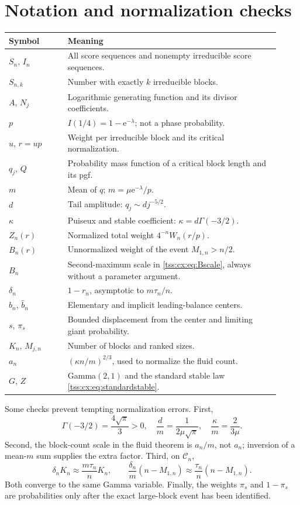 \documentclass[11pt]{article}
\theoremstyle{remark}\newtheorem{remark}[theorem]{Remark}
\theoremstyle{definition}\newtheorem{definition}[theorem]{Definition}
\newcommand{\e}{\mathrm e}
\newcommand{\Cev}{\mathcal C_n}
\begin{document}
\section{Notation and normalization checks}\label{tss:cx:app:notation}
\begin{longtable}{@{}p{0.20\linewidth}p{0.72\linewidth}@{}}
\toprule
Symbol & Meaning\\
\midrule\endhead
$S_n$, $I_n$ & All score sequences and nonempty irreducible score sequences.\\
$S_{n,k}$ & Number with exactly $k$ irreducible blocks.\\
$A$, $N_j$ & Logarithmic generating function and its divisor coefficients.\\
$p$ & $I(1/4)=1-\e^{-\lambda}$; not a phase probability.\\
$u$, $r=up$ & Weight per irreducible block and its critical normalization.\\
$q_j$, $Q$ & Probability mass function of a critical block length and its pgf.\\
$m$ & Mean of $q$; $m=\mu\e^{-\lambda}/p$.\\
$d$ & Tail amplitude: $q_j\sim d j^{-5/2}$.\\
$\kappa$ & Puiseux and stable coefficient: $\kappa=d\Gamma(-3/2)$.\\
$Z_n(r)$ & Normalized total weight $4^{-n}W_n(r/p)$.\\
$B_n(r)$ & Unnormalized weight of the event $M_{1,n}>n/2$.\\
$B_n$ & Second-maximum scale in \eqref{tss:cx:eq:Bscale}, always without a parameter argument.\\
$\delta_n$ & $1-r_n$, asymptotic to $m\tau_n/n$.\\
$b_n$, $\widehat b_n$ & Elementary and implicit leading-balance centers.\\
$s$, $\pi_s$ & Bounded displacement from the center and limiting giant probability.\\
$K_n$, $M_{j,n}$ & Number of blocks and ranked sizes.\\
$a_n$ & $(\kappa n/m)^{2/3}$, used to normalize the fluid count.\\
$G$, $Z$ & Gamma$(2,1)$ and the standard stable law \eqref{tss:cx:eq:standardstable}.\\
\bottomrule
\end{longtable}

Some checks prevent tempting normalization errors. First,
\[
 \Gamma(-3/2)=\frac{4\sqrt\pi}{3}>0,
 \quad \frac{d}{m}=\frac1{2\mu\sqrt\pi},
 \quad \frac{\kappa}{m}=\frac2{3\mu}.
\]
Second, the block-count scale in the fluid theorem is $a_n/m$,
not $a_n$; inversion of a mean-$m$ sum supplies the extra factor.
Third, on $\Cev$,
\[
 \delta_nK_n\approx\frac{m\tau_n}{n}K_n,
 \qquad \frac{\delta_n}{m}(n-M_{1,n})
       \approx\frac{\tau_n}{n}(n-M_{1,n}).
\]
Both converge to the same Gamma variable. Finally, the weights
$\pi_s$ and $1-\pi_s$ are probabilities only after the exact
large-block event has been identified.
\end{document}
